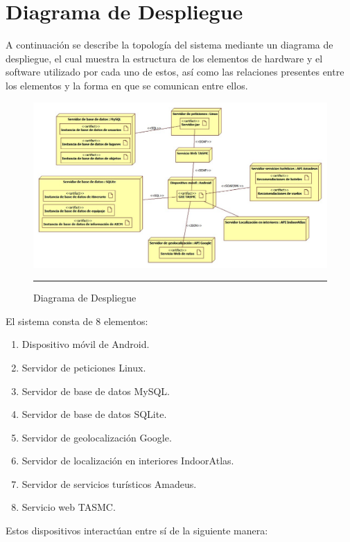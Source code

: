 \section{Diagrama de Despliegue}

A continuación se describe la topología del sistema mediante un diagrama de despliegue, el cual muestra la estructura de los elementos de hardware y el software utilizado por cada uno de estos, así como las relaciones presentes entre los elementos y la forma en que se comunican entre ellos.

\begin{figure}[h]
	\centering
		\includegraphics[width=1\textwidth]{Figuras/diagramaDespliegue.png}
		\rule{30em}{0.5pt}
	\caption[Diagrama de Despliegue]{Diagrama de Despliegue}
	\label{fig:diagramaDespliegue}
\end{figure}

El sistema consta de 8 elementos:

\begin{enumerate}
	\item Dispositivo móvil de Android.
	\item Servidor de peticiones Linux.
	\item Servidor de base de datos MySQL.
	\item Servidor de base de datos SQLite.
	\item Servidor de geolocalización Google.
	\item Servidor de localización en interiores IndoorAtlas.
	\item Servidor de servicios turísticos Amadeus.
	\item Servicio web TASMC.
\end{enumerate}

Estos dispositivos interactúan entre sí de la siguiente manera: 

